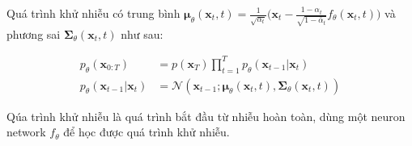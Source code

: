 Quá trình khử nhiễu có trung bình $\boldsymbol{\mu}_\theta(\mathbf{x}_t, t) = {\frac{1}{\sqrt{\alpha_t}} \Big( \mathbf{x}_t - \frac{1 - \alpha_t}{\sqrt{1 - \bar{\alpha}_t}}  f_\theta(\mathbf{x}_t, t) \Big)}$ và phương sai $\boldsymbol{\Sigma}_\theta(\mathbf{x}_t, t)$ như sau:




\begin{equation}
	\label{eq:denoising_process}
	\begin{aligned}
		p_\theta(\mathbf{x}_{0:T})
		&= p(\mathbf{x}_T) \prod^T_{t=1} p_\theta(\mathbf{x}_{t-1} \vert \mathbf{x}_t) \\
		p_\theta(\mathbf{x}_{t-1} \vert \mathbf{x}_t) &= \mathcal{N}(\mathbf{x}_{t-1};  \boldsymbol{\mu}_\theta(\mathbf{x}_t, t), \boldsymbol{\Sigma}_\theta(\mathbf{x}_t, t))
	\end{aligned}
\end{equation}

Qúa trình khử nhiễu là quá trình bắt đầu từ nhiễu hoàn toàn, dùng một neuron network $f_\theta$ để học được quá trình khử nhiễu.





